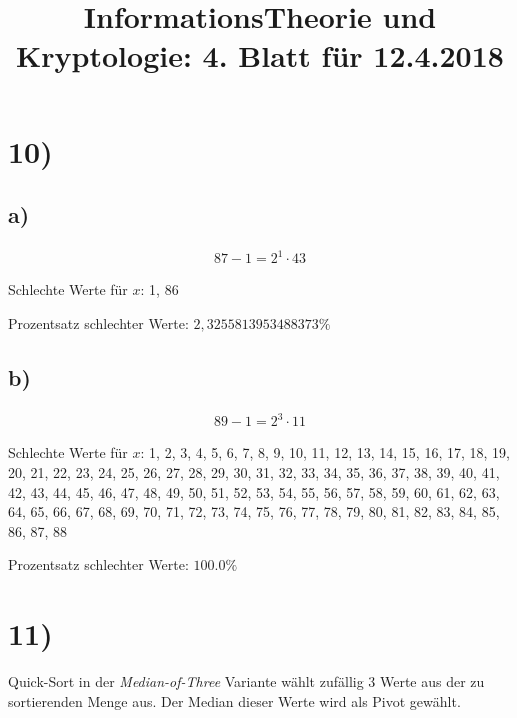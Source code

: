 %



  \title{InformationsTheorie und Kryptologie: 4. Blatt für 12.4.2018}
  \maketitle

  \section*{10)}



  

  \subsection*{a)}

  \begin{align*}
    87 - 1 = 2^{1} \cdot 43
  \end{align*}

  Schlechte Werte für $x$: 1, 86

  Prozentsatz schlechter Werte: $2,3255813953488373 \% $

  \subsection*{b)}

  \begin{align*}
    89 - 1 = 2^{3} \cdot 11
  \end{align*}

  Schlechte Werte für $x$: 1, 2, 3, 4, 5, 6, 7, 8, 9, 10, 11, 12, 13, 14, 15, 16, 17, 18, 19, 20, 21, 22, 23, 24, 25, 26, 27, 28, 29, 30, 31, 32, 33, 34, 35, 36, 37, 38, 39, 40, 41, 42, 43, 44, 45, 46, 47, 48, 49, 50, 51, 52, 53, 54, 55, 56, 57, 58, 59, 60, 61, 62, 63, 64, 65, 66, 67, 68, 69, 70, 71, 72, 73, 74, 75, 76, 77, 78, 79, 80, 81, 82, 83, 84, 85, 86, 87, 88

  Prozentsatz schlechter Werte: $100.0 \%$


  \section*{11)}

    Quick-Sort in der \textit{Median-of-Three} Variante wählt zufällig 3 Werte aus der zu sortierenden Menge aus. Der Median dieser Werte wird als Pivot gewählt.\\

